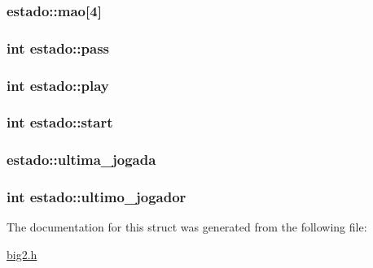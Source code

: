 \hypertarget{structestado_a69ee2cdf37e53968050df5c4b8e2cf51}{
\subsubsection[{mao}]{ estado\-::mao\mbox{[}4\mbox{]}}}\label{structestado_a69ee2cdf37e53968050df5c4b8e2cf51}
\hypertarget{structestado_a8953eb970b94ff6087eb596f09d0ff94}{
\subsubsection[{pass}]{\setlength{\rightskip}{0pt plus 5cm}int estado\-::pass}}\label{structestado_a8953eb970b94ff6087eb596f09d0ff94}
\hypertarget{structestado_a594b925e4cb17da72275fbf44d620f30}{
\subsubsection[{play}]{\setlength{\rightskip}{0pt plus 5cm}int estado\-::play}}\label{structestado_a594b925e4cb17da72275fbf44d620f30}
\hypertarget{structestado_a20ecce4f918a139a722514d4852dda20}{
\subsubsection[{start}]{\setlength{\rightskip}{0pt plus 5cm}int estado\-::start}}\label{structestado_a20ecce4f918a139a722514d4852dda20}
\hypertarget{structestado_adbe7db5c55b9ffff331f0a551a8c0212}{
\subsubsection[{ultima\-\_\-jogada}]{ estado\-::ultima\-\_\-jogada}}\label{structestado_adbe7db5c55b9ffff331f0a551a8c0212}
\hypertarget{structestado_acb67e3c2edb271ab6fa1139396c5e247}{
\subsubsection[{ultimo\-\_\-jogador}]{\setlength{\rightskip}{0pt plus 5cm}int estado\-::ultimo\-\_\-jogador}}\label{structestado_acb67e3c2edb271ab6fa1139396c5e247}


The documentation for this struct was generated from the following file\-:\begin{DoxyCompactItemize}
\item 
\hyperlink{big2_8h}{big2.\-h}\end{DoxyCompactItemize}

